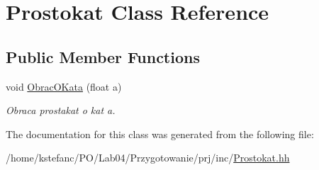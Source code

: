 \hypertarget{class_prostokat}{\section{Prostokat Class Reference}
\label{class_prostokat}
}
\subsection*{Public Member Functions}
\begin{DoxyCompactItemize}
\item 
\hypertarget{class_prostokat_afa56151dcbb5d3fd9fb5d10c6140743c}{void \hyperlink{class_prostokat_afa56151dcbb5d3fd9fb5d10c6140743c}{Obrac\+O\+Kata} (float a)}\label{class_prostokat_afa56151dcbb5d3fd9fb5d10c6140743c}

\begin{DoxyCompactList}\small\item\em Obraca prostakat o kat a. \end{DoxyCompactList}\end{DoxyCompactItemize}


The documentation for this class was generated from the following file\+:\begin{DoxyCompactItemize}
\item 
/home/kstefanc/\+P\+O/\+Lab04/\+Przygotowanie/prj/inc/\hyperlink{_prostokat_8hh}{Prostokat.\+hh}\end{DoxyCompactItemize}
